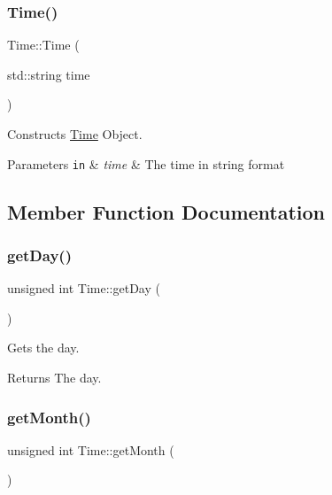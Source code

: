 \subsubsection{\texorpdfstring{Time()}{Time()}\hspace{0.1cm}{\footnotesize\ttfamily [2/2]}}
{\footnotesize\ttfamily Time\+::\+Time (\begin{DoxyParamCaption}\item[{std\+::string}]{time }\end{DoxyParamCaption})}



Constructs \hyperlink{classTime}{Time} Object. 


\begin{DoxyParams}[1]{Parameters}
\mbox{\tt in}  & {\em time} & The time in string format \\
\hline
\end{DoxyParams}


\subsection{Member Function Documentation}
\mbox{\label{classTime_abdccc37217b520155a67a1d732014f1a}} 
\subsubsection{\texorpdfstring{get\+Day()}{getDay()}}
{\footnotesize\ttfamily unsigned int Time\+::get\+Day (\begin{DoxyParamCaption}{ }\end{DoxyParamCaption})}



Gets the day. 

\begin{DoxyReturn}{Returns}
The day. 
\end{DoxyReturn}
\mbox{\label{classTime_a22fd86b14d3b067cf1447fd9ca5caf6f}} 
\subsubsection{\texorpdfstring{get\+Month()}{getMonth()}}
{\footnotesize\ttfamily unsigned int Time\+::get\+Month (\begin{DoxyParamCaption}{ }\end{DoxyParamCaption})}




